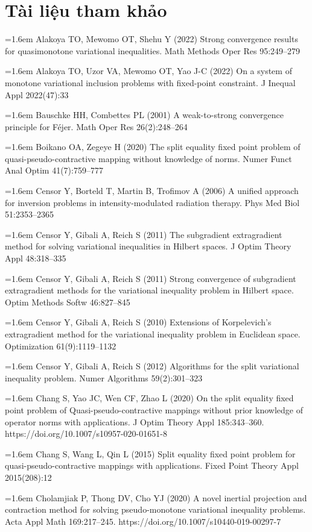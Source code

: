 \documentclass[11pt,a4paper]{article}
\theoremstyle{plain}
\theoremstyle{definition}
\theoremstyle{remark}
\numberwithin{equation}{section}
\begin{document}
\section*{Tài liệu tham khảo}
{\small
\setlength{\parindent}{0pt}
\newcommand{\refitem}[1]{\par\hangindent=1.6em #1\par\vspace{2pt}}

\refitem{Alakoya TO, Mewomo OT, Shehu Y (2022) Strong convergence results for quasimonotone variational inequalities. Math Methods Oper Res 95:249--279}
\refitem{Alakoya TO, Uzor VA, Mewomo OT, Yao J-C (2022) On a system of monotone variational inclusion problems with fixed-point constraint. J Inequal Appl 2022(47):33}
\refitem{Bauschke HH, Combettes PL (2001) A weak-to-strong convergence principle for Féjer. Math Oper Res 26(2):248--264}
\refitem{Boikano OA, Zegeye H (2020) The split equality fixed point problem of quasi-pseudo-contractive mapping without knowledge of norms. Numer Funct Anal Optim 41(7):759--777}
\refitem{Censor Y, Borteld T, Martin B, Trofimov A (2006) A unified approach for inversion problems in intensity-modulated radiation therapy. Phys Med Biol 51:2353--2365}
\refitem{Censor Y, Gibali A, Reich S (2011) The subgradient extragradient method for solving variational inequalities in Hilbert spaces. J Optim Theory Appl 48:318--335}
\refitem{Censor Y, Gibali A, Reich S (2011) Strong convergence of subgradient extragradient methods for the variational inequality problem in Hilbert space. Optim Methods Softw 46:827--845}
\refitem{Censor Y, Gibali A, Reich S (2010) Extensions of Korpelevich's extragradient method for the variational inequality problem in Euclidean space. Optimization 61(9):1119--1132}
\refitem{Censor Y, Gibali A, Reich S (2012) Algorithms for the split variational inequality problem. Numer Algorithms 59(2):301--323}
\refitem{Chang S, Yao JC, Wen CF, Zhao L (2020) On the split equality fixed point problem of Quasi-pseudo-contractive mappings without prior knowledge of operator norms with applications. J Optim Theory Appl 185:343--360. https://doi.org/10.1007/s10957-020-01651-8}
\refitem{Chang S, Wang L, Qin L (2015) Split equality fixed point problem for quasi-pseudo-contractive mappings with applications. Fixed Point Theory Appl 2015(208):12}
\refitem{Cholamjiak P, Thong DV, Cho YJ (2020) A novel inertial projection and contraction method for solving pseudo-monotone variational inequality problems. Acta Appl Math 169:217--245. https://doi.org/10.1007/s10440-019-00297-7}
}
\end{document}
